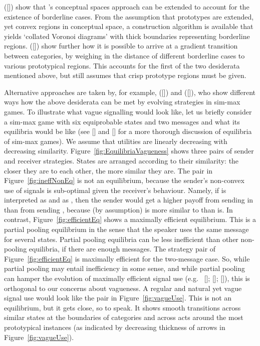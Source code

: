 \documentclass[12pt,english]{article}
\numberwithin{equation}{section}
\newcommand{\citetbjps}[1]{\citeauthor{#1} ([\citeyear{#1}])}
\newcommand{\citealtbjps}[1]{\citeauthor{#1} [\citeyear{#1}]}
\begin{document}
\citetbjps{DouvenDecock2011:Vagueness:-A-Co} show that
\citeauthor{Gardenfors2000:Conceptual-Spac}'s conceptual spaces
approach can be extended to account for the existence of borderline
cases. From the assumption that prototypes are extended, yet convex
regions in conceptual space, a construction algorithm is available
that yields `collated Voronoi diagrams' with thick boundaries
representing borderline
regions. \citetbjps{DecockDouven2012:What-is-Graded-} show further how it
is possible to arrive at a gradient transition between categories, by
weighing in the distance of different borderline cases to various
prototypical regions. This accounts for the first of the two
desiderata mentioned above, but still assumes that crisp prototype
regions must be given.

Alternative approaches are taken by, for example, \citetbjps{FrankeJager2010:Vagueness-Signa} and
\citetbjps{OConnor2013:The-Evolution-o}, who show different ways how the above desiderata can be
met by evolving strategies in sim-max games. To illustrate what vague signalling would look
like, let us briefly consider a sim-max game with six equiprobable states and two messages and
what its equilibria would be like (see \citealtbjps{Jager2007:The-Evolution-o} and \citealtbjps{OConnor2013:The-Evolution-o} for a more thorough discussion of equilibria of
sim-max games). We assume that utilities
are linearly decreasing with decreasing similarity. Figure~\ref{fig:EquilibriaVagueness} shows
three pairs of sender and receiver strategies. States are arranged according to their
similarity: the closer they are to each other, the more similar they are. The pair in
Figure~\ref{fig:ineffNonEq} is not an equilibrium, because the sender's non-convex use of
signals is sub-optimal given the receiver's behaviour. Namely, if  is interpreted as
 and  as , then the sender would get a higher payoff from
sending  in  than from sending , because (by assumption)
 is more similar to  than  is. In contrast,
Figure~\ref{fig:efficientEq} shows a maximally efficient equilibrium. This is a partial pooling
equilibrium in the sense that the speaker uses the same message for several states. Partial
pooling equilibria can be less inefficient than other non-pooling equilibria, if there are
enough messages. The strategy pair of Figure~\ref{fig:efficientEq} is maximally efficient for
the two-message case. So, while partial pooling may entail inefficiency in some sense, and
while partial pooling can hamper the evolution of maximally efficient signal use
(e.g.~\citealtbjps{Hutteger:2007-Evol-Indicatives-Imperatives}; \citealtbjps{Pawlowitsch2008:Why-Evolution-d}; \citealtbjps{HutteggerSkyrms2010:Evolutionary-Dy}),
this is orthogonal to our concerns about vagueness. A regular and natural yet vague signal use
would look like the pair in Figure~\ref{fig:vagueUse}. This is not an equilibrium, but it gets
close, so to speak. It shows smooth transitions across similar states at the boundaries of
categories and across acts around the most prototypical instances (as indicated by decreasing
thickness of arrows in Figure~\ref{fig:vagueUse}).
\end{document}

